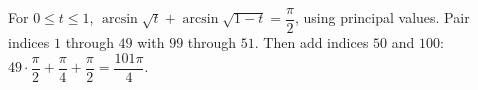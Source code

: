 For $0\le t\le1$, $\arcsin\sqrt t+\arcsin\sqrt{1-t}=\dfrac{\pi}{2}$, using principal values. Pair indices $1$ through $49$ with $99$ through $51$. Then add indices $50$ and $100$: $49\cdot\dfrac{\pi}{2}+\dfrac{\pi}{4}+\dfrac{\pi}{2}=\boxed{\dfrac{101\pi}{4}}$.
